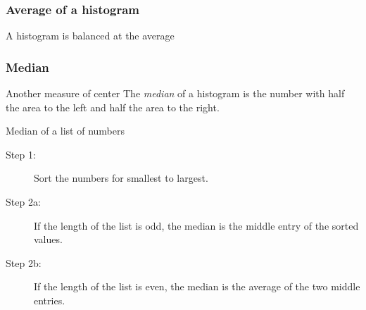 \documentclass[handout]{beamer}
\begin{document}


   \begin{frame}
   \frametitle{Average of a histogram}
   \begin{center}
   \end{center}
   A histogram is balanced at the average
   \end{frame}


   \begin{frame} \frametitle{Median}

   \begin{block}
   {Another measure of center}
   The {\em median} of a histogram is the number with half the area to
   the left and half the area to the right.

   \end{block}

   \begin{block}
   {Median of a list of numbers}

   \begin{description}
   \item[Step 1:] Sort the numbers for smallest to largest.

   \item[Step 2a:] If the length of the list is odd, the median is the middle
   entry of the sorted values.

   \item[Step 2b:] If the length of the list is even, the median is the average
   of the two middle entries.

   \end{description}
   \end{block}
   \end{frame}
\end{document}
